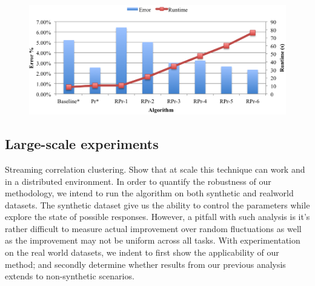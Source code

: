 \begin{figure}[ht]
\centering
\includegraphics[scale=0.5]{fig4.png}
\caption{}
\label{exp:ms-academic-ranking}
\end{figure}


\subsection{Large-scale experiments}
Streaming correlation clustering. Show that at scale this technique can work and in a distributed environment.
In order to quantify the robustness of our methodology, we intend to run the algorithm on both synthetic and realworld datasets.
The synthetic dataset give us the ability to control the parameters while explore the state of possible responses.
However, a pitfall with such analysis is it's rather difficult to measure actual improvement over random fluctuations as well as the improvement may not be uniform across all tasks.
With experimentation on the real world datasets, we indent to first show the applicability of our method; and secondly determine whether results from our previous analysis extends to non-synthetic scenarios.


